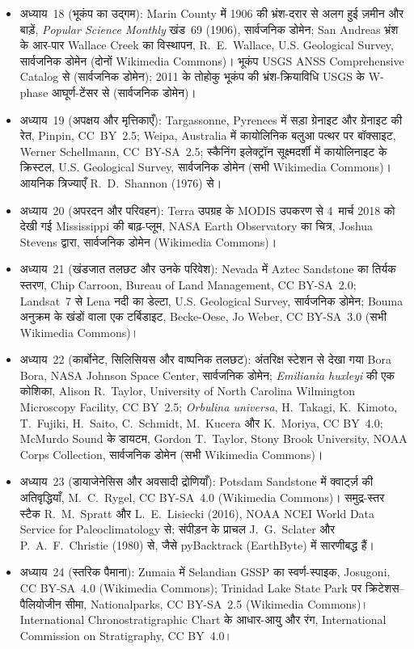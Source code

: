 \begin{itemize}
  \item अध्याय~18 (भूकंप का उद्गम): Marin County में 1906 की भ्रंश-दरार से अलग हुई ज़मीन और बाड़ें, \emph{Popular Science Monthly} खंड~69 (1906), सार्वजनिक डोमेन; San Andreas भ्रंश के आर-पार Wallace Creek का विस्थापन, R.~E.~Wallace, U.S. Geological Survey, सार्वजनिक डोमेन (दोनों Wikimedia Commons)। भूकंप USGS ANSS Comprehensive Catalog से (सार्वजनिक डोमेन); 2011 के तोहोकु भूकंप की भ्रंश-क्रियाविधि USGS के W-phase आघूर्ण-टेंसर से (सार्वजनिक डोमेन)।
  \item अध्याय~19 (अपक्षय और मृत्तिकाएँ): Targassonne, Pyrenees में सड़ा ग्रेनाइट और ग्रेनाइट की रेत, Pinpin, CC~BY~2.5; Weipa, Australia में कायोलिनिक बलुआ पत्थर पर बॉक्साइट, Werner Schellmann, CC~BY-SA~2.5; स्कैनिंग इलेक्ट्रॉन सूक्ष्मदर्शी में कायोलिनाइट के क्रिस्टल, U.S. Geological Survey, सार्वजनिक डोमेन (सभी Wikimedia Commons)। आयनिक त्रिज्याएँ R.~D.~Shannon (1976) से।
  \item अध्याय~20 (अपरदन और परिवहन): Terra उपग्रह के MODIS उपकरण से 4~मार्च 2018 को देखी गई Mississippi की बाढ़-प्लूम, NASA Earth Observatory का चित्र, Joshua Stevens द्वारा, सार्वजनिक डोमेन (Wikimedia Commons)।
  \item अध्याय~21 (खंडजात तलछट और उनके परिवेश): Nevada में Aztec Sand\-stone का तिर्यक स्तरण, Chip Carroon, Bureau of Land Management, CC BY-SA~2.0; Landsat~7 से Lena नदी का डेल्टा, U.S. Geological Survey, सार्वजनिक डोमेन; Bouma अनुक्रम के खंडों वाला एक टर्बिडाइट, Becke-Oese, Jo Weber, CC BY-SA~3.0 (सभी Wikimedia Commons)।
  \item अध्याय~22 (कार्बोनेट, सिलिसियस और वाष्पनिक तलछट): अंतरिक्ष स्टेशन से देखा गया Bora Bora, NASA Johnson Space Center, सार्वजनिक डोमेन; \emph{Emiliania huxleyi} की एक कोशिका, Alison R.~Taylor, University of North Carolina Wilmington Microscopy Facility, CC BY~2.5; \emph{Orbulina universa}, H.~Takagi, K.~Kimoto, T.~Fujiki, H.~Saito, C.~Schmidt, M.~Kucera और K.~Moriya, CC BY~4.0; McMurdo Sound के डायटम, Gordon T.~Taylor, Stony Brook University, NOAA Corps Collection, सार्वजनिक डोमेन (सभी Wikimedia Commons)।
  \item अध्याय~23 (डायाजेनेसिस और अवसादी द्रोणियाँ): Potsdam Sand\-stone में क्वार्ट्ज़ की अतिवृद्धियाँ, M.~C.~Rygel, CC BY-SA~4.0 (Wikimedia Commons)। समुद्र-स्तर स्टैक R.~M.~Spratt और L.~E.~Lisiecki (2016), NOAA NCEI World Data Service for Paleo\-climatology से; संपीड़न के प्राचल J.~G.~Sclater और P.~A.~F.~Christie (1980) से, जैसे pyBacktrack (EarthByte) में सारणीबद्ध हैं।
  \item अध्याय~24 (स्तरिक पैमाना): Zumaia में Selandian GSSP का स्वर्ण-स्पाइक, Josugoni, CC BY-SA~4.0 (Wikimedia Commons); Trinidad Lake State Park पर क्रिटेशस--पैलियोजीन सीमा, Nationalparks, CC BY-SA~2.5 (Wikimedia Commons)। International Chronostratigraphic Chart के आधार-आयु और रंग, International Commission on Stratigraphy, CC BY~4.0।

\end{itemize}

